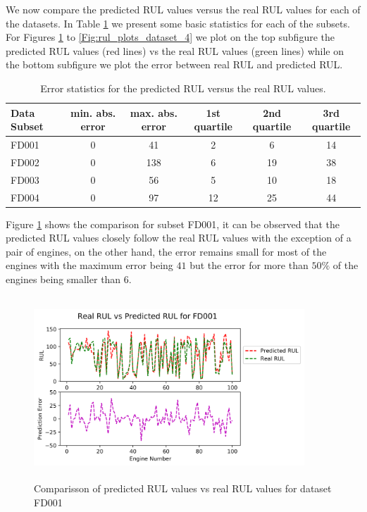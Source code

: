 \documentclass[preprint,12pt]{elsarticle}%
\begin{document}
We now compare the predicted RUL values versus the real RUL values for each of the datasets. In Table \ref{table:rul_vs_results} we present some basic statistics for each of the subsets. For Figures \ref{Fig:rul_plots_dataset_1} to \ref{Fig:rul_plots_dataset_4} we plot on the top subfigure the predicted RUL values (red lines) vs the real RUL values (green lines) while on the bottom subfigure we plot the error between real RUL and predicted RUL.

\begin{table}[!htb]
\begin{center}
\begin{tabular}[c]{l | c c c c c}\hline
Data Subset & min. abs. error & max. abs. error & 1st quartile & 2nd quartile & 3rd quartile \\\hline
FD001 & 0 & 41 & 2 & 6 & 14 \\
FD002 & 0 & 138 & 6 & 19 & 38 \\
FD003 & 0 & 56 & 5 & 10 & 18 \\
FD004 & 0 & 97 & 12 & 25 & 44 \\\hline
\end{tabular}
\caption{Error statistics for the predicted RUL versus the real RUL values.}
\label{table:rul_vs_results}
\end{center}
\end{table}

Figure \ref{Fig:rul_plots_dataset_1} shows the comparison for subset FD001, it can be observed that the predicted RUL values closely follow the real RUL values with the exception of a pair of engines, on the other hand, the error remains small for most of the engines with the maximum error being $41$ but the error for more than $50\%$ of the engines being smaller than $6$. 

\begin{figure}[!htb]
\begin{center}
\includegraphics[height=2.7in,width=4in]{Figures/rul_plots_dataset_1.png}
\caption{Comparisson of predicted RUL values vs real RUL values for dataset FD001}
\label{Fig:rul_plots_dataset_1}
\end{center}
\end{figure}
\end{document}
